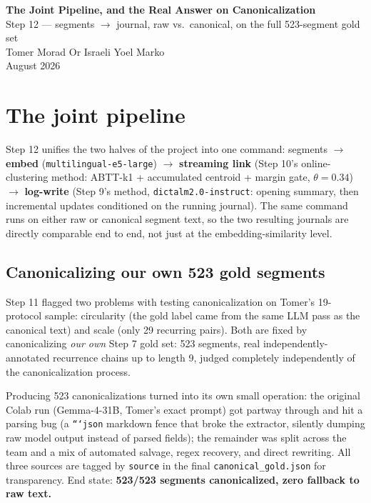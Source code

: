 \documentclass[11pt,a4paper]{article}
\begin{document}
\begin{center}
  {\LARGE \textbf{The Joint Pipeline, and the Real Answer on Canonicalization}}\\[0.3em]
  {\large Step 12 --- segments $\to$ journal, raw vs.\ canonical, on the full 523-segment gold set}\\[0.6em]
  {\normalsize Tomer Morad \quad Or Israeli \quad Yoel Marko}\\
  {\normalsize August 2026}
\end{center}

\vspace{0.4em}

\section{The joint pipeline}

Step 12 unifies the two halves of the project into one command: segments $\to$
\textbf{embed} (\texttt{multilingual-e5-large}) $\to$ \textbf{streaming link} (Step 10's
online-clustering method: ABTT-k1 + accumulated centroid + margin gate, $\theta=0.34$) $\to$
\textbf{log-write} (Step 9's method, \texttt{dictalm2.0-instruct}: opening summary, then
incremental updates conditioned on the running journal). The same command runs on either raw
or canonical segment text, so the two resulting journals are directly comparable end to end,
not just at the embedding-similarity level.

\subsection{Canonicalizing our own 523 gold segments}

Step 11 flagged two problems with testing canonicalization on Tomer's 19-protocol sample:
circularity (the gold label came from the same LLM pass as the canonical text) and scale
(only 29 recurring pairs). Both are fixed by canonicalizing \emph{our own} Step 7 gold set:
523 segments, real independently-annotated recurrence chains up to length 9, judged
completely independently of the canonicalization process.

Producing 523 canonicalizations turned into its own small operation: the original Colab run
(Gemma-4-31B, Tomer's exact prompt) got partway through and hit a parsing bug (a
\texttt{```json} markdown fence that broke the extractor, silently dumping raw model output
instead of parsed fields); the remainder was split across the team and a mix of automated
salvage, regex recovery, and direct rewriting. All three sources are tagged by
\texttt{source} in the final \texttt{canonical\_gold.json} for transparency. End state:
\textbf{523/523 segments canonicalized, zero fallback to raw text.}
\end{document}
